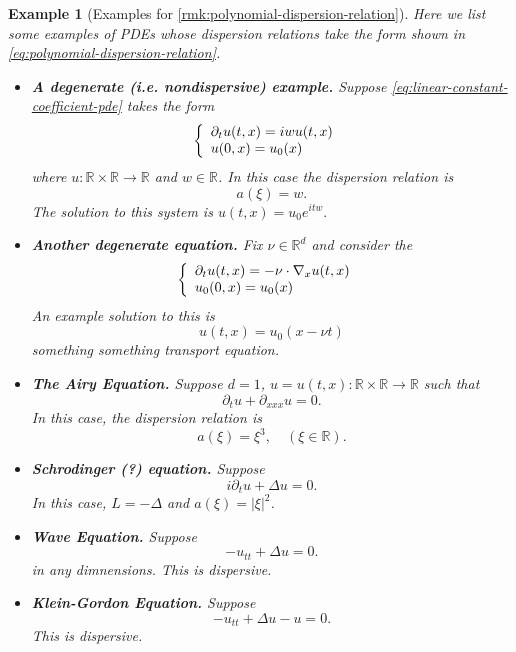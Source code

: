\documentclass{article}
\makeatletter
\newtheorem{example}{Example}
\def\R{\mathbb{R}} %
\newcommand{\curly}[2]{\left\{ \begin{array}{l@{\quad}l}#1\\#2\end{array}\right.}
\makeatother
\begin{document}
\begin{example}[Examples for \cref{rmk:polynomial-dispersion-relation}]
  Here we list some examples of PDEs whose dispersion relations take the form
  shown in \cref{eq:polynomial-dispersion-relation}.
  \begin{itemize}
    \item \textbf{A degenerate (i.e. nondispersive) example.} Suppose
    \cref{eq:linear-constant-coefficient-pde} takes the form
    \begin{equation*}
      \curly{\partial_{t}u(t,x) = iwu(t,x)}{u(0,x)=u_{0}(x)}
    \end{equation*}
    where $u:\R\times\R\to\R$ and $w\in \R$. In this case the dispersion
    relation is
    \begin{equation*}
      a(\xi) = w.
    \end{equation*}
    The solution to this system is $u(t,x)= u_{0}e^{itw}.$
    \item \textbf{Another degenerate equation.} Fix $\nu\in \R^{d}$ and
    consider the
    \begin{equation*}
      \curly{\partial_{t}u(t,x) = -\nu\cdot \nabla_{x}u(t,x)}{u_{0}(0,x)=u_{0}(x)}
    \end{equation*}
    An example solution to this is
    \begin{equation*}
      u(t,x) = u_{0}(x-\nu t)
    \end{equation*}
    something something transport equation. 

    \item \textbf{The Airy Equation.} Suppose $d=1$, $u=u(t,x):\R\times\R \to \R$ such
    that
    \begin{equation*}
      \partial_{t}u +\partial_{xxx}u=0.
    \end{equation*}
    In this case, the dispersion relation is
    \begin{equation*}
      a(\xi) = \xi^{3},\quad (\xi\in \R).
    \end{equation*}

    \item \textbf{Schrodinger (?) equation.} Suppose
    \begin{equation*}
      i\partial_{t}u +\Delta u = 0.
    \end{equation*}
    In this case, $L=-\Delta$ and $a(\xi)=|\xi|^{2}$. 
    \item \textbf{Wave Equation.} Suppose
    \begin{equation}\label{eq:wave-equation}
      -u_{tt}+\Delta u = 0.
    \end{equation}
    in any dimnensions. This is dispersive.
    \item \textbf{Klein-Gordon Equation.} Suppose
    \begin{equation*}
      -u_{tt} + \Delta u - u = 0.
    \end{equation*}
    This is dispersive.
  \end{itemize}
\end{example}
\end{document}
